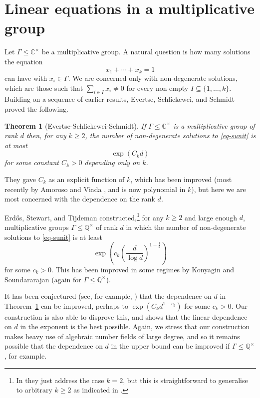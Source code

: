 \documentclass{amsart}
\numberwithin{equation}{section}
\newcommand{\bbq}{\mathbb{Q}}
\newcommand{\brac}[1]{\mathopen{}\left( #1 \mathclose{}\right)}
\newcommand{\bbc}{\mathbb{C}}
\newtheorem{theorem}{Theorem}[section]
\begin{document}
\section{Linear equations in a multiplicative group}\label{sec-linear}
Let $\Gamma\leq \bbc^\times$ be a multiplicative group. A natural question is how many solutions the equation
\begin{equation}\label{eq-sunit}
x_1+\cdots+x_k=1
\end{equation}
can have with $x_i\in \Gamma$. We are concerned only with non-degenerate solutions, which are those such that $\sum_{i\in I}x_i\neq 0$ for every non-empty $I\subseteq \{1,\ldots,k\}$. Building on a sequence of earlier results, Evertse, Schlickewei, and Schmidt \cite{ESS02} proved the following.
\begin{theorem}[Evertse-Schlickewei-Schmidt]\label{th-ess}
If $\Gamma\leq \bbc^\times$ is a multiplicative group of rank $d$ then, for any $k\geq 2$, the number of non-degenerate solutions to \eqref{eq-sunit} is at most
\[\exp(C_kd)\]
for some constant $C_k>0$ depending only on $k$.
\end{theorem}
They gave $C_k$ as an explicit function of $k$, which has been improved (most recently by Amoroso and Viada \cite{AmVi09}, and is now polynomial in $k$), but here we are most concerned with the dependence on the rank $d$.

Erd\H{o}s, Stewart, and Tijdeman \cite{EST88} constructed,\footnote{In \cite{EST88} they just address the case $k=2$, but this is straightforward to generalise to arbitrary $k\geq 2$ as indicated in \cite{ESS02}.} for any $k\geq 2$ and large enough $d$, multiplicative groups $\Gamma\leq \bbq^\times$ of rank $d$ in which the number of non-degenerate solutions to \eqref{eq-sunit} is at least
\[\exp\brac{ c_k \brac{\frac{d}{\log d}}^{1-\frac{1}{k}}}\]
for some $c_k>0$. This has been improved in some regimes by Konyagin and Soundararajan \cite{KoSo07} (again for $\Gamma\leq \bbq^\times$).

It has been conjectured (see, for example, \cite{ESS02}) that the dependence on $d$ in Theorem~\ref{th-ess} can be improved, perhaps to $\exp(C_kd^{1-c_k})$ for some $c_k>0$. Our construction is also able to disprove this, and shows that the linear dependence on $d$ in the exponent is the best possible. Again, we stress that our construction makes heavy use of algebraic number fields of large degree, and so it remains possible that the dependence on $d$ in the upper bound can be improved if $\Gamma\leq \bbq^\times$, for example.
\end{document}
